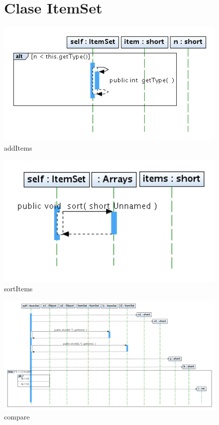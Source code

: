 \begin{figure}
\section{Clase ItemSet}
\includegraphics[width=1\textwidth]{ItemSet/addItems.png}
\caption{addItems}
\end{figure}
\newpage
\begin{figure}
\includegraphics[width=1\textwidth]{ItemSet/sortItems.png}
\caption{sortItems}
\end{figure}
\newpage
\begin{figure}
\includegraphics[width=1.2\textwidth]{ItemSet/compare.png}
\caption{compare}
\end{figure}
\newpage


